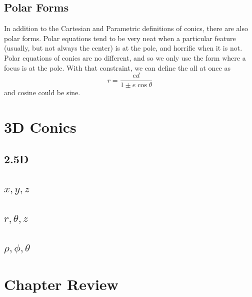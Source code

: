 \subsection{Polar Forms}
In addition to the Cartesian and Parametric definitions of conics, there are also polar
forms.  Polar equations tend to be very neat when a particular feature (usually, but not
always the center) is at the pole, and horrific when it is not.  Polar equations of conics are
no different, and so we only use the form where a focus is at the pole.  With that constraint,
we can define the all at once as
\begin{equation}
r = \frac{ed}{1\pm e\cos\theta}
\end{equation}
and cosine could be sine.

\newpage
\section{3D Conics}
\noindent{}
\subsection{2.5D}
\subsection{$x, y, z$}
\subsection{$r, \theta, z$}
\subsection{$\rho, \phi, \theta$}

\section{Chapter Review}